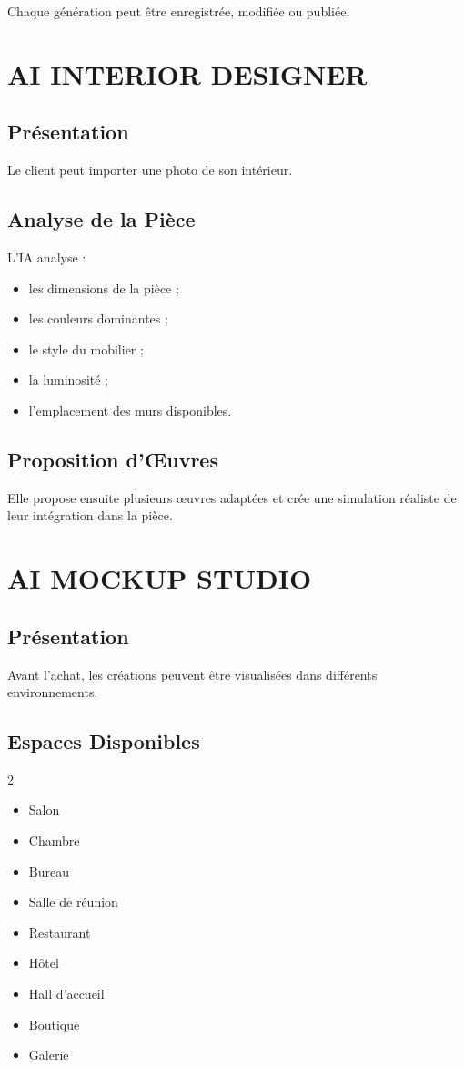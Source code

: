 \documentclass[12pt,a4paper,oneside]{book}
\begin{document}
Chaque génération peut être enregistrée, modifiée ou publiée.

\chapter{AI INTERIOR DESIGNER}

\section{Présentation}
Le client peut importer une photo de son intérieur.

\section{Analyse de la Pièce}
L'IA analyse :
\begin{itemize}
\item les dimensions de la pièce ;
\item les couleurs dominantes ;
\item le style du mobilier ;
\item la luminosité ;
\item l'emplacement des murs disponibles.
\end{itemize}

\section{Proposition d'Œuvres}
Elle propose ensuite plusieurs œuvres adaptées et crée une simulation réaliste de leur intégration dans la pièce.

\chapter{AI MOCKUP STUDIO}

\section{Présentation}
Avant l'achat, les créations peuvent être visualisées dans différents environnements.

\section{Espaces Disponibles}
\begin{multicols}{2}
\begin{itemize}
\item Salon
\item Chambre
\item Bureau
\item Salle de réunion
\item Restaurant
\item Hôtel
\item Hall d'accueil
\item Boutique
\item Galerie
\end{itemize}
\end{multicols}
\end{document}

